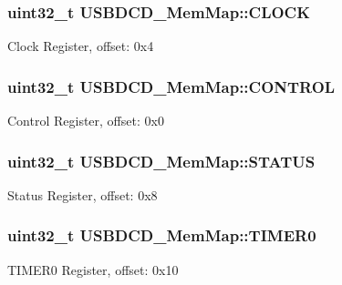 \subsubsection[{C\+L\+O\+C\+K}]{\setlength{\rightskip}{0pt plus 5cm}uint32\+\_\+t U\+S\+B\+D\+C\+D\+\_\+\+Mem\+Map\+::\+C\+L\+O\+C\+K}\label{struct_u_s_b_d_c_d___mem_map_a86ba3b0e7a077a4b9afbe207f335216c}
Clock Register, offset\+: 0x4 \hypertarget{struct_u_s_b_d_c_d___mem_map_a6d1149f9d598e71d5f6d5cf12ab1a5d5}{}
\subsubsection[{C\+O\+N\+T\+R\+O\+L}]{\setlength{\rightskip}{0pt plus 5cm}uint32\+\_\+t U\+S\+B\+D\+C\+D\+\_\+\+Mem\+Map\+::\+C\+O\+N\+T\+R\+O\+L}\label{struct_u_s_b_d_c_d___mem_map_a6d1149f9d598e71d5f6d5cf12ab1a5d5}
Control Register, offset\+: 0x0 \hypertarget{struct_u_s_b_d_c_d___mem_map_aef7d6303adc8b41b479d65f8f1d4c3e2}{}
\subsubsection[{S\+T\+A\+T\+U\+S}]{\setlength{\rightskip}{0pt plus 5cm}uint32\+\_\+t U\+S\+B\+D\+C\+D\+\_\+\+Mem\+Map\+::\+S\+T\+A\+T\+U\+S}\label{struct_u_s_b_d_c_d___mem_map_aef7d6303adc8b41b479d65f8f1d4c3e2}
Status Register, offset\+: 0x8 \hypertarget{struct_u_s_b_d_c_d___mem_map_aecfb36e34db08abcd8984d10a9f87e7c}{}
\subsubsection[{T\+I\+M\+E\+R0}]{\setlength{\rightskip}{0pt plus 5cm}uint32\+\_\+t U\+S\+B\+D\+C\+D\+\_\+\+Mem\+Map\+::\+T\+I\+M\+E\+R0}\label{struct_u_s_b_d_c_d___mem_map_aecfb36e34db08abcd8984d10a9f87e7c}
T\+I\+M\+E\+R0 Register, offset\+: 0x10 \hypertarget{struct_u_s_b_d_c_d___mem_map_aa8bcdbeba3cbd7a27281d317ba5484e9}{}
